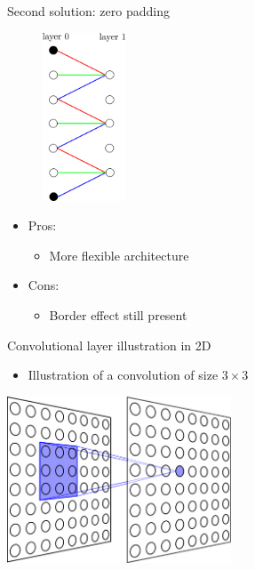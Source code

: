 \documentclass[xcolor=pdftex,dvipsnames,table,mathserif]{beamer}
\begin{document}
\begin{frame}{Second solution: zero padding}

  \begin{figure}
    \includegraphics[height=5cm]{conv_border_effect3}
  \end{figure}

\begin{itemize}
\item Pros:
  \begin{itemize}
  \item More flexible architecture
  \end{itemize}
\item Cons:
  \begin{itemize}
  \item Border effect still present
  \end{itemize}
\end{itemize}

\end{frame}




\begin{frame}{Convolutional layer illustration in 2D}


  \begin{itemize}
  \item Illustration of a convolution of size $3 \times 3$
  \end{itemize}

  \begin{center}
    \includegraphics[width=0.5\textwidth]{cnn_complet}
  \end{center}


\end{frame}
\end{document}
